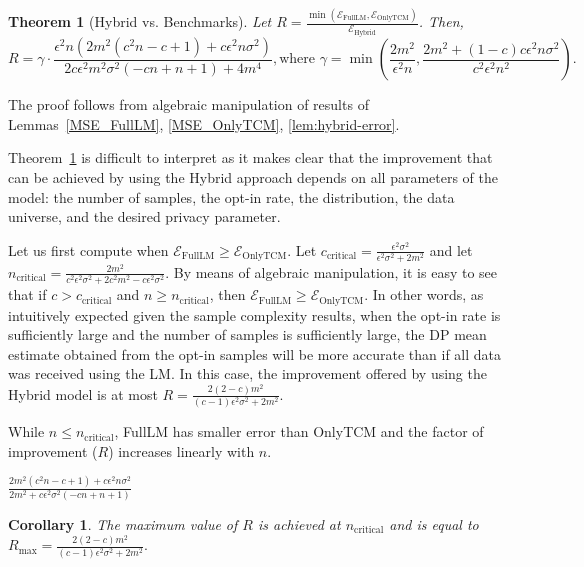 \documentclass{article}
\theoremstyle{plain}
\newtheorem{thm}{Theorem}[section]
\newtheorem*{cor}{Corollary}
\begin{document}
\begin{thm}[Hybrid vs. Benchmarks]\label{thm:main}
Let $R = \frac{\min(\mathcal{E}_{\text{FullLM}}, \mathcal{E}_{\text{OnlyTCM}})}{\mathcal{E}_{\text{Hybrid}}}$.
Then, 
$$R = \gamma \cdot \frac{\epsilon^2 n \left(2 m^2 \left(c^2 n-c+1\right)+c \epsilon^2 n \sigma^2\right)}{2 c \epsilon^2 m^2 \sigma^2 (-c n+n+1)+4 m^4}, \text{where } \gamma = \min \left(\frac{2 m^2}{\epsilon^2 n},\frac{2 m^2+(1-c) c \epsilon^2 n \sigma^2}{c^2 \epsilon^2 n^2}\right).$$
\end{thm}
The proof follows from algebraic manipulation of results of Lemmas~\ref{MSE_FullLM}, \ref{MSE_OnlyTCM}, \ref{lem:hybrid-error}.

Theorem~\ref{thm:main} is difficult to interpret as it makes clear that the improvement that can be achieved by using the Hybrid approach depends on all parameters of the model: the number of samples, the opt-in rate, the distribution, the data universe, and the desired privacy parameter.

Let us first compute when $\mathcal{E}_{\text{FullLM}} \geq \mathcal{E}_{\text{OnlyTCM}}.$  Let $c_{\text{critical}} = \frac{\epsilon^2 \sigma^2}{\epsilon^2 \sigma^2+2 m^2}$ and let $n_{\text{critical}} = \frac{2 m^2}{c^2 \epsilon^2 \sigma^2+2 c^2 m^2-c \epsilon^2 \sigma^2}.$ By means of algebraic manipulation, it is easy to see that if $c>c_{\text{critical}}$ and $n \geq n_{\text{critical}}$, then $\mathcal{E}_{\text{FullLM}} \geq \mathcal{E}_{\text{OnlyTCM}}.$ %
In other words, as intuitively expected given the sample complexity results, when the opt-in rate is sufficiently large and the number of samples is sufficiently large, the DP mean estimate obtained from the opt-in samples will be more accurate than if all data was received using the LM. In this case, the improvement offered by using the Hybrid model is at most $R = \frac{2 (2-c) m^2}{(c-1) \epsilon^2 \sigma^2+2 m^2}.$

While $n \leq n_{\text{critical}}$, FullLM has smaller error than OnlyTCM and the factor of improvement ($R$) increases linearly with $n$. 

$\frac{2 m^2 \left(c^2 n-c+1\right)+c \epsilon^2 n \sigma^2 }{2 m^2 + c \epsilon^2 \sigma^2 (-c n+n+1)}$

\begin{cor}
The maximum value of $R$ is achieved at $n_{\text{critical}}$ and is equal to $R_{\text{max}} = \frac{2 (2-c) m^2}{(c-1) \epsilon^2 \sigma^2+2 m^2}.$
\end{cor}
\end{document}
